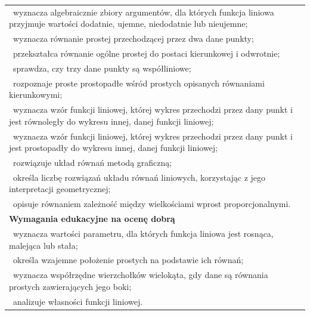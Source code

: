 \documentclass[12pt,a4paper]{article}
\begin{document}
\begin{longtable}{|p{16cm}|}
		\textbullet\ wyznacza algebraicznie zbiory argumentów, dla których funkcja liniowa przyjmuje wartości dodatnie, ujemne, niedodatnie lub nieujemne; \\
		
		\textbullet\ wyznacza równanie prostej przechodzącej przez dwa dane punkty; \\
		
		\textbullet\ przekształca równanie ogólne prostej do postaci kierunkowej i odwrotnie; \\
		
		\textbullet\ sprawdza, czy trzy dane punkty są współliniowe; \\
		
		\textbullet\ rozpoznaje proste prostopadłe wśród prostych opisanych równaniami kierunkowymi; \\
		
		\textbullet\ wyznacza wzór funkcji liniowej, której wykres przechodzi przez dany punkt i jest równoległy do wykresu innej, danej funkcji liniowej; \\
		
		\textbullet\ wyznacza wzór funkcji liniowej, której wykres przechodzi przez dany punkt i jest prostopadły do wykresu innej, danej funkcji liniowej; \\
		
		\textbullet\ rozwiązuje układ równań metodą graficzną; \\
		
		\textbullet\ określa liczbę rozwiązań układu równań liniowych, korzystając z jego interpretacji geometrycznej; \\
		
		\textbullet\ opisuje równaniem zależność między wielkościami wprost proporcjonalnymi. \\ \hline
		
		\textbf{Wymagania edukacyjne na ocenę dobrą} \\ \hline
		
		\textbullet\ wyznacza wartości parametru, dla których funkcja liniowa jest rosnąca, malejąca lub stała; \\
		
		\textbullet\ określa wzajemne położenie prostych na podstawie ich równań; \\
		
		\textbullet\ wyznacza współrzędne wierzchołków wielokąta, gdy dane są równania prostych zawierających jego boki; \\
		
		\textbullet\ analizuje własności funkcji liniowej. \\ \hline
		

\end{longtable}
\end{document}

